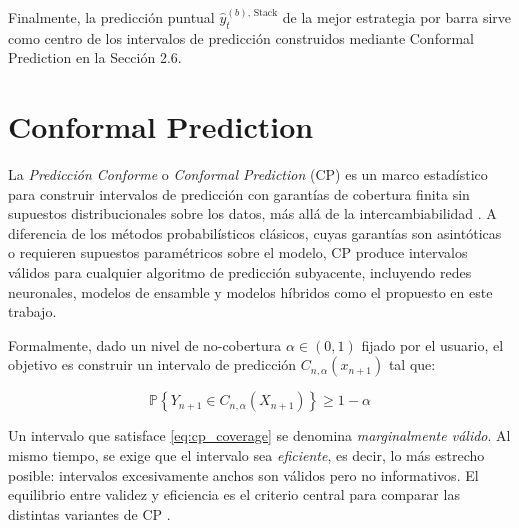 Finalmente, la predicción puntual $\hat{y}_t^{(b),\,\text{Stack}}$ de la mejor estrategia por barra sirve como centro de los intervalos de predicción construidos mediante Conformal Prediction en la Sección 2.6.

\section{Conformal Prediction}

La \textit{Predicción Conforme} o \textit{Conformal Prediction} (CP) es un marco estadístico para construir intervalos de predicción con garantías de cobertura finita sin supuestos distribucionales sobre los datos, más allá de la intercambiabilidad \cite{VovkCP, AngelopoulosBates2021}. A diferencia de los métodos probabilísticos clásicos, cuyas garantías son asintóticas o requieren supuestos paramétricos sobre el modelo, CP produce intervalos válidos para cualquier algoritmo de predicción subyacente, incluyendo redes neuronales, modelos de ensamble y modelos híbridos como el propuesto en este trabajo.

Formalmente, dado un nivel de no-cobertura $\alpha \in (0,1)$ fijado por el usuario, el objetivo es construir un intervalo de predicción $C_{n,\alpha}(x_{n+1})$ tal que:

\begin{equation}
    \mathbb{P}\!\left\{Y_{n+1} \in C_{n,\alpha}(X_{n+1})\right\} \geq 1 - \alpha
    \label{eq:cp_coverage}
\end{equation}

Un intervalo que satisface \eqref{eq:cp_coverage} se denomina \textit{marginalmente válido}. Al mismo tiempo, se exige que el intervalo sea \textit{eficiente}, es decir, lo más estrecho posible: intervalos excesivamente anchos son válidos pero no informativos. El equilibrio entre validez y eficiencia es el criterio central para comparar las distintas variantes de CP \cite{ConformalPrediction}.

